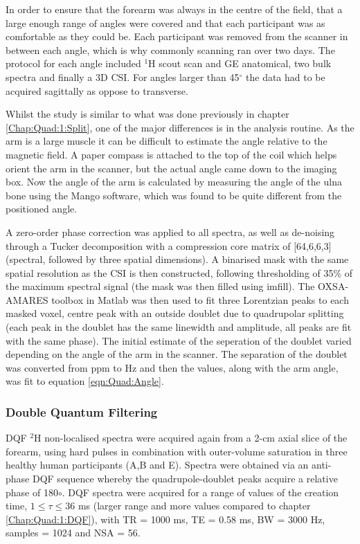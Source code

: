 In order to ensure that the forearm was always in the centre of the field, that a large enough range of angles were covered and that each participant was as comfortable as they could be. Each participant was removed from the scanner in between each angle, which is why commonly scanning ran over two days. The protocol for each angle included $^1$H scout scan and \ac{GE} anatomical, two bulk spectra and finally a 3D \ac{CSI}. For angles larger than 45$^\circ$ the data had to be acquired sagittally as oppose to transverse.

Whilst the study is similar to what was done previously in chapter \ref{Chap:Quad:1:Split}, one of the major differences is in the analysis routine. As the arm is a large muscle it can be difficult to estimate the angle relative to the magnetic field. A paper compass is attached to the top of the coil which helps orient the arm in the scanner, but the actual angle came down to the imaging box. Now the angle of the arm is calculated by measuring the angle of the ulna bone using the Mango software, which was found to be quite different from the positioned angle.

A zero-order phase correction was applied to all spectra, as well as de-noising through a Tucker decomposition \cite{Bader2007EfficientTensors} with a compression core matrix of [64,6,6,3] (spectral, followed by three spatial dimensions). A binarised mask with the same spatial resolution as the \ac{CSI} is then constructed, following thresholding of 35\% of the maximum spectral signal (the mask was then filled using imfill). The OXSA-AMARES \cite{Purvis2017OXSA:MATLAB} toolbox in Matlab was then used to fit three Lorentzian peaks to each masked voxel, centre peak with an outside doublet due to quadrupolar splitting (each peak in the doublet has the same linewidth and amplitude, all peaks are fit with the same phase). The initial estimate of the seperation of the doublet varied depending on the angle of the arm in the scanner. The separation of the doublet was converted from ppm to Hz and then the values, along with the arm angle, was fit to equation \ref{eqn:Quad:Angle}.

\subsubsection{Double Quantum Filtering}

\ac{DQF} $^2$H non-localised spectra were acquired again from a 2-cm axial slice of the forearm, using hard pulses in combination with outer-volume saturation in three healthy human participants (A,B and E). Spectra were obtained via an anti-phase \ac{DQF} sequence \cite{Sharf1995DetectionNMR-Spectroscopy} whereby the quadrupole-doublet peaks acquire a relative phase of 180$\circ$. \ac{DQF} spectra were acquired for a range of values of the creation time, $1\leq\tau\leq36$ ms (larger range and more values compared to chapter \ref{Chap:Quad:1:DQF}), with \ac{TR} = 1000 ms, \ac{TE} = 0.58 ms, \ac{BW} = 3000 Hz, samples = 1024 and NSA = 56.


